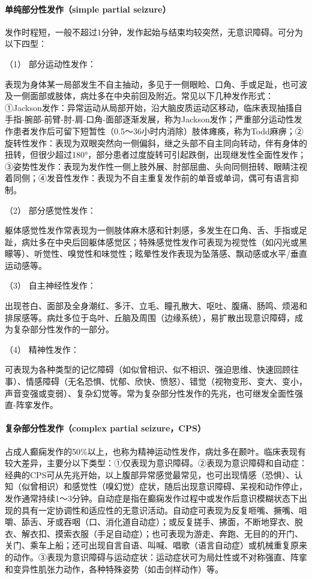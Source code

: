 \paragraph{单纯部分性发作（simple partial seizure）}

发作时程短，一般不超过1分钟，发作起始与结束均较突然，无意识障碍。可分为以下四型：

\hypertarget{text00245.htmlux5cux23CHP8-2-2-2-2-1-1}{}
（1） 部分运动性发作：

表现为身体某一局部发生不自主抽动，多见于一侧眼睑、口角、手或足趾，也可波及一侧面部或肢体，病灶多在中央前回及附近。常见以下几种发作形式：①Jackson发作：异常运动从局部开始，沿大脑皮质运动区移动，临床表现抽搐自手指-腕部-前臂-肘-肩-口角-面部逐渐发展，称为Jackson发作；严重部分运动性发作患者发作后可留下短暂性（0.5～36小时内消除）肢体瘫痪，称为Todd麻痹；②旋转性发作：表现为双眼突然向一侧偏斜，继之头部不自主同向转动，伴有身体的扭转，但很少超过180°，部分患者过度旋转可引起跌倒，出现继发性全面性发作；③姿势性发作：表现为发作性一侧上肢外展、肘部屈曲、头向同侧扭转、眼睛注视着同侧；④发音性发作：表现为不自主重复发作前的单音或单词，偶可有语言抑制。

\hypertarget{text00245.htmlux5cux23CHP8-2-2-2-2-1-2}{}
（2） 部分感觉性发作：

躯体感觉性发作常表现为一侧肢体麻木感和针刺感，多发生在口角、舌、手指或足趾，病灶多在中央后回躯体感觉区；特殊感觉性发作可表现为视觉性（如闪光或黑矇等）、听觉性、嗅觉性和味觉性；眩晕性发作表现为坠落感、飘动感或水平/垂直运动感等。

\hypertarget{text00245.htmlux5cux23CHP8-2-2-2-2-1-3}{}
（3） 自主神经性发作：

出现苍白、面部及全身潮红、多汗、立毛、瞳孔散大、呕吐、腹痛、肠鸣、烦渴和排尿感等。病灶多位于岛叶、丘脑及周围（边缘系统），易扩散出现意识障碍，成为复杂部分性发作的一部分。

\hypertarget{text00245.htmlux5cux23CHP8-2-2-2-2-1-4}{}
（4） 精神性发作：

可表现为各种类型的记忆障碍（如似曾相识、似不相识、强迫思维、快速回顾往事）、情感障碍（无名恐惧、忧郁、欣快、愤怒）、错觉（视物变形、变大、变小，声音变强或变弱）、复杂幻觉等。常为复杂部分性发作的先兆，也可继发全面性强直-阵挛发作。

\paragraph{复杂部分性发作（complex partial seizure，CPS）}

占成人癫痫发作的50\%以上，也称为精神运动性发作，病灶多在颞叶。临床表现有较大差异，主要分以下类型：①仅表现为意识障碍。②表现为意识障碍和自动症：经典的CPS可从先兆开始，以上腹部异常感觉最常见，也可出现情感（恐惧）、认知（似曾相识）和感觉性（嗅幻觉）症状，随后出现意识障碍、呆视和动作停止，发作通常持续1～3分钟。自动症是指在癫痫发作过程中或发作后意识模糊状态下出现的具有一定协调性和适应性的无意识活动。自动症可表现为反复咂嘴、撅嘴、咀嚼、舔舌、牙或吞咽（口、消化道自动症）；或反复搓手、拂面，不断地穿衣、脱衣、解衣扣、摸索衣服（手足自动症）；也可表现为游走、奔跑、无目的的开门、关门、乘车上船；还可出现自言自语、叫喊、唱歌（语言自动症）或机械重复原来的动作。③表现为意识障碍与运动症状：运动症状可为局灶性或不对称强直、阵挛和变异性肌张力动作，各种特殊姿势（如击剑样动作）等。

